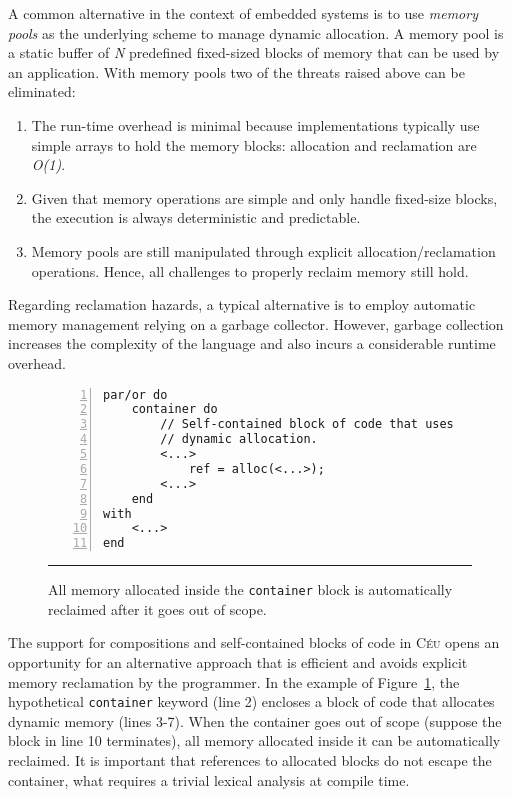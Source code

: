 \documentclass[pdftex,12pt,a4paper]{article}
\newcommand{\CEU}{\textsc{C\'{e}u}\xspace}
\newcommand{\code}[1] {{\small{\texttt{#1}}}}
\begin{document}
A common alternative in the context of embedded systems is to use \emph{memory 
pools} as the underlying scheme to manage dynamic allocation.
A memory pool is a static buffer of \emph{N} predefined fixed-sized blocks of 
memory that can be used by an application.
%
With memory pools two of the threats raised above can be eliminated:

\begin{enumerate}
\item
The run-time overhead is minimal because implementations typically use simple 
arrays to hold the memory blocks: allocation and reclamation are \emph{O(1)}.
\item
Given that memory operations are simple and only handle fixed-size blocks, the 
execution is always deterministic and predictable.
\item
Memory pools are still manipulated through explicit allocation/reclamation 
operations.
Hence, all challenges to properly reclaim memory still hold.
\end{enumerate}

Regarding reclamation hazards, a typical alternative is to employ automatic 
memory management relying on a garbage collector.
%
However, garbage collection increases the complexity of the language and also 
incurs a considerable runtime overhead.

\begin{figure}[t]
\begin{lstlisting}[numbers=left,xleftmargin=3em]
par/or do
    container do
        // Self-contained block of code that uses
        // dynamic allocation.
        <...>
            ref = alloc(<...>);
        <...>
    end
with
    <...>
end
\end{lstlisting}
\rule{13.8cm}{0.37pt}
\caption{
    All memory allocated inside the \code{container} block is automatically 
    reclaimed after it goes out of scope.
    \label{lst.container}
}
\end{figure}

The support for compositions and self-contained blocks of code in \CEU opens an 
opportunity for an alternative approach that is efficient and avoids explicit 
memory reclamation by the programmer.
%
In the example of Figure~\ref{lst.container}, the hypothetical \code{container} 
keyword (line 2) encloses a block of code that allocates dynamic memory (lines 
3-7).
When the container goes out of scope (suppose the block in line 10 terminates), 
all memory allocated inside it can be automatically reclaimed.
It is important that references to allocated blocks do not escape the 
container, what requires a trivial lexical analysis at compile time.
\end{document}
